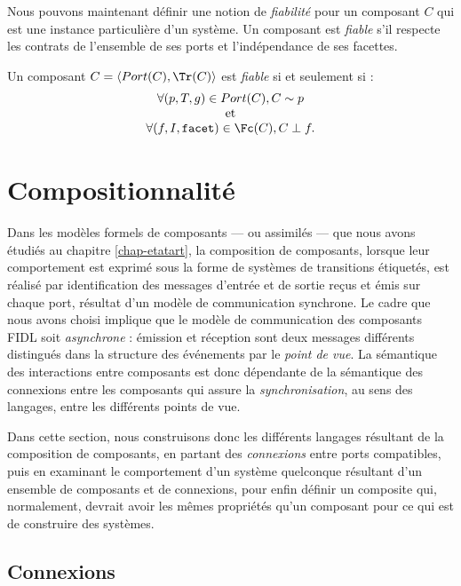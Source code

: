 Nous pouvons maintenant d\'efinir une notion de \emph{fiabilit\'e} pour un
composant $C$ qui est une instance particuli\`ere d'un syst\`eme. Un
composant est \emph{fiable} s'il respecte les contrats de l'ensemble
de ses ports et l'ind\'ependance de ses facettes.

\begin{definition}
\label{def:fiab-dun-comp}
    Un composant $C=\langle Port(C),\Tr(C)\rangle$ est \emph{fiable}
    si et seulement si : 
$$
    \begin{array}{c}
 \forall (p,T,g)\in Port(C), C \sim p \\
\mbox{~et~} \\
 \forall (f,I,\mathtt{facet})\in \Fc(C), C\perp
f.
\end{array}
$$
\end{definition}

\section{Compositionnalit\'e} 
\label{sec:compositionnalite}

Dans les mod\`eles formels de composants --- ou assimil\'es --- que
nous avons \'etudi\'es au chapitre \ref{chap-etatart}, la
composition de composants, lorsque leur comportement est exprim\'e
sous la forme de syst\`emes de transitions \'etiquet\'es, est
r\'ealis\'e par identification des messages d'entr\'ee et de
sortie re\c{c}us et \'emis sur chaque port, r\'esultat d'un mod\`ele
de communication synchrone. Le cadre que nous avons choisi implique
que le mod\`ele de communication des composants FIDL soit \emph{asynchrone} :
\'emission et r\'eception sont deux messages diff\'erents
distingu\'es dans la structure des \'ev\'enements par le \emph{point de
vue}. La s\'emantique des interactions entre composants est donc
d\'ependante de la s\'emantique des connexions entre les composants
qui assure la \emph{synchronisation}, au sens des langages, entre les
diff\'erents points de vue.

Dans cette section, nous construisons donc les diff\'erents langages
r\'esultant de la composition de composants, en partant des
\emph{connexions} entre ports compatibles, puis en examinant le
comportement d'un syst\`eme quelconque r\'esultant d'un ensemble de
composants et de connexions, pour enfin d\'efinir un composite qui,
normalement, devrait avoir les m\^emes propri\'et\'es qu'un
composant pour ce qui est de construire des syst\`emes.

\subsection{Connexions}

